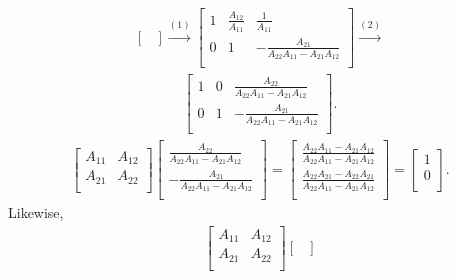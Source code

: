 \documentclass[12pt]{article}
\begin{document}
\begin{enumerate}
\begin{align*}
\begin{bmatrix}
      \end{bmatrix}
      \xrightarrow{(1)}
      \begin{bmatrix}
        1 & \frac{A_{12}}{A_{11}} & \frac{1}{A_{11}}\\
        0 & 1 & -\frac{A_{21}}{A_{22}A_{11} - A_{21}A_{12}}\\
      \end{bmatrix}
      \xrightarrow{(2)}
    \end{align*}
    \begin{align*}
      \begin{bmatrix}
        1 &
          0 &
          \frac{A_{22}}{A_{22}A_{11} - A_{21}A_{12}}\\
        0 &
          1 &
          -\frac{A_{21}}{A_{22}A_{11} - A_{21}A_{12}}\\
      \end{bmatrix}.
    \end{align*}
    \begin{align*}
      \begin{bmatrix}
        A_{11} & A_{12}\\
        A_{21} & A_{22}\\
      \end{bmatrix}
      \begin{bmatrix}
        \frac{A_{22}}{A_{22}A_{11} - A_{21}A_{12}}\\
        -\frac{A_{21}}{A_{22}A_{11} - A_{21}A_{12}}\\
      \end{bmatrix}
      =
      \begin{bmatrix}
        \frac{A_{22}A_{11} - A_{21}A_{12}}
             {A_{22}A_{11} - A_{21}A_{12}}\\
        \frac{A_{22}A_{21} - A_{22}A_{21}}
             {A_{22}A_{11} - A_{21}A_{12}}\\
      \end{bmatrix}
      =
      \begin{bmatrix}
        1\\
        0\\
      \end{bmatrix}.
    \end{align*}
    Likewise,
    \begin{align*}
      \begin{bmatrix}
        A_{11} & A_{12}\\
        A_{21} & A_{22}\\
      \end{bmatrix}
      \begin{bmatrix}

\end{bmatrix}
\end{align*}
\end{enumerate}
\end{document}
